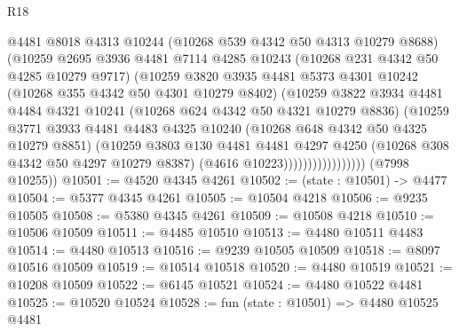 \begin{lexlean}{R18}
\begin{coremodule}
                            @4481
                            @8018
                            @4313
                            @10244
                            (@10268 @539 @4342 @50 @4313 @10279 @8688)
                            (@10259
                              @2695
                              @3936
                              @4481
                              @7114
                              @4285
                              @10243
                              (@10268 @231 @4342 @50 @4285 @10279 @9717)
                              (@10259
                                @3820
                                @3935
                                @4481
                                @5373
                                @4301
                                @10242
                                (@10268 @355 @4342 @50 @4301 @10279 @8402)
                                (@10259
                                  @3822
                                  @3934
                                  @4481
                                  @4484
                                  @4321
                                  @10241
                                  (@10268 @624 @4342 @50 @4321 @10279 @8836)
                                  (@10259
                                    @3771
                                    @3933
                                    @4481
                                    @4483
                                    @4325
                                    @10240
                                    (@10268 @648 @4342 @50 @4325 @10279 @8851)
                                    (@10259
                                      @3803
                                      @130
                                      @4481
                                      @4481
                                      @4297
                                      @4250
                                      (@10268 @308 @4342 @50 @4297 @10279 @8387)
                                      (@4616 @10223)))))))))))))))))
      (@7998 @10255))
@10501 := @4520 @4345 @4261
@10502 := (state : @10501) -> @4477
@10504 := @5377 @4345 @4261
@10505 := @10504 @4218
@10506 := @9235 @10505
@10508 := @5380 @4345 @4261
@10509 := @10508 @4218
@10510 := @10506 @10509
@10511 := @4485 @10510
@10513 := @4480 @10511 @4483
@10514 := @4480 @10513
@10516 := @9239 @10505 @10509
@10518 := @8097 @10516 @10509
@10519 := @10514 @10518
@10520 := @4480 @10519
@10521 := @10208 @10509
@10522 := @6145 @10521
@10524 := @4480 @10522 @4481
@10525 := @10520 @10524
@10528 := fun (state : @10501) => @4480 @10525 @4481

\end{coremodule}
\end{lexlean}
